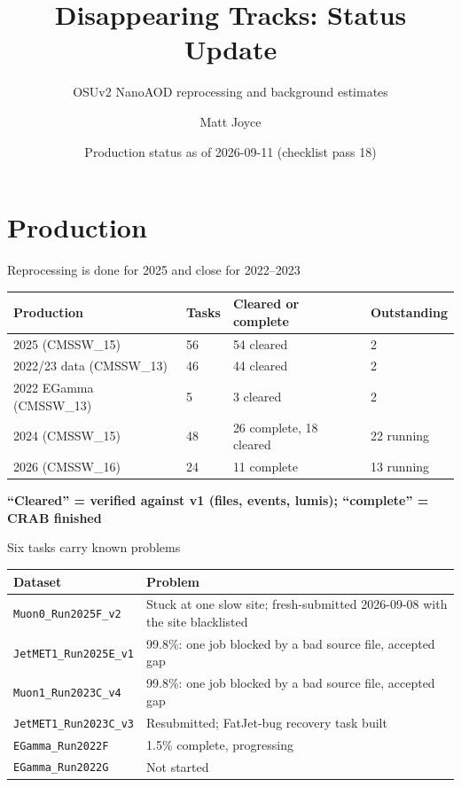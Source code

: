 \documentclass[aspectratio=169,12pt]{beamer}
\title[Status update]{Disappearing Tracks: Status Update}
\subtitle{OSUv2 NanoAOD reprocessing and background estimates}
\author[M. Joyce]{Matt Joyce}
\institute[OSU]{The Ohio State University}
\date[\today]{Production status as of 2026-09-11 (checklist pass 18)}
\newcommand{\takeaway}[1]{\par\vspace{10pt}\centering\small\textbf{#1}\par}
\begin{document}
\begin{frame}[plain]\titlepage\end{frame}

\section{Production}

\begin{frame}{Reprocessing is done for 2025 and close for 2022--2023}
  \centering\small
  \begin{tabular}{p{}p{}p{}p{}}
    \toprule
    Production & Tasks & Cleared or complete & Outstanding \\
    \midrule
    2025 (CMSSW\_15) & 56 & 54 cleared & 2 \\
    2022/23 data (CMSSW\_13) & 46 & 44 cleared & 2 \\
    2022 EGamma (CMSSW\_13) & 5 & 3 cleared & 2 \\
    2024 (CMSSW\_15) & 48 & 26 complete, 18 cleared & 22 running \\
    2026 (CMSSW\_16) & 24 & 11 complete & 13 running \\
    \bottomrule
  \end{tabular}
  \takeaway{``Cleared'' = verified against v1 (files, events, lumis); ``complete'' = CRAB finished}
\end{frame}

\begin{frame}{Six tasks carry known problems}
  \small
  \begin{tabular}{p{}p{}}
    \toprule
    Dataset & Problem \\
    \midrule
    \texttt{Muon0\_Run2025F\_v2} & Stuck at one slow site; fresh-submitted 2026-09-08 with the site blacklisted \\
    \texttt{JetMET1\_Run2025E\_v1} & 99.8\%: one job blocked by a bad source file, accepted gap \\
    \texttt{Muon1\_Run2023C\_v4} & 99.8\%: one job blocked by a bad source file, accepted gap \\
    \texttt{JetMET1\_Run2023C\_v3} & Resubmitted; FatJet-bug recovery task built \\
    \texttt{EGamma\_Run2022F} & 1.5\% complete, progressing \\
    \texttt{EGamma\_Run2022G} & Not started \\
    \bottomrule
  \end{tabular}
\end{frame}
\end{document}
